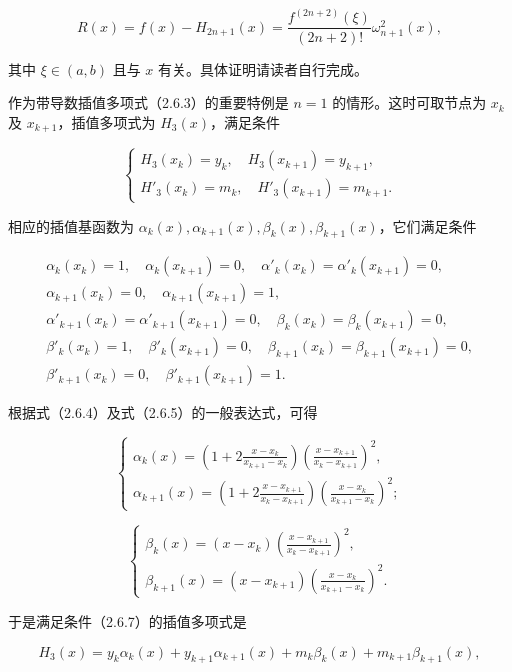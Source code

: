 \documentclass[
  10pt,
  fontset=fandol]{ctexart}
\begin{document}
\[R(x)=f(x)-H_{2n+1}(x)=\frac{f^{(2n+2)}(\xi)}{(2n+2)!}\omega_{n+1}^2(x),\tag{2.6.6}\]

其中 \(\xi\in(a,b)\) 且与 \(x\) 有关。具体证明请读者自行完成。

作为带导数插值多项式（2.6.3）的重要特例是 \(n=1\) 的情形。这时可取节点为 \(x_k\) 及 \(x_{k+1}\)，插值多项式为 \(H_3(x)\)，满足条件

\[\begin{cases}
H_3(x_k)=y_k,\quad H_3(x_{k+1})=y_{k+1},\\
H'_3(x_k)=m_k,\quad H'_3(x_{k+1})=m_{k+1}.
\end{cases}\tag{2.6.7}\]

相应的插值基函数为 \(\alpha_k(x),\alpha_{k+1}(x),\beta_k(x),\beta_{k+1}(x)\)，它们满足条件

\[\begin{gathered}
\alpha_k(x_k)=1,\quad\alpha_k(x_{k+1})=0,\quad\alpha'_k(x_k)=\alpha'_k(x_{k+1})=0,\\
\alpha_{k+1}(x_k)=0,\quad\alpha_{k+1}(x_{k+1})=1,\\
\alpha'_{k+1}(x_k)=\alpha'_{k+1}(x_{k+1})=0,\quad\beta_k(x_k)=\beta_k(x_{k+1})=0,\\
\beta'_k(x_k)=1,\quad\beta'_k(x_{k+1})=0,\quad\beta_{k+1}(x_k)=\beta_{k+1}(x_{k+1})=0,\\
\beta'_{k+1}(x_k)=0,\quad\beta'_{k+1}(x_{k+1})=1.
\end{gathered}\]

根据式（2.6.4）及式（2.6.5）的一般表达式，可得

\[\begin{cases}
\displaystyle\alpha_k(x)=\left(1+2\frac{x-x_k}{x_{k+1}-x_k}\right)\left(\frac{x-x_{k+1}}{x_k-x_{k+1}}\right)^2,\\[6pt]
\displaystyle\alpha_{k+1}(x)=\left(1+2\frac{x-x_{k+1}}{x_k-x_{k+1}}\right)\left(\frac{x-x_k}{x_{k+1}-x_k}\right)^2;
\end{cases}\tag{2.6.8}\]

\[\begin{cases}
\displaystyle\beta_k(x)=(x-x_k)\left(\frac{x-x_{k+1}}{x_k-x_{k+1}}\right)^2,\\[6pt]
\displaystyle\beta_{k+1}(x)=(x-x_{k+1})\left(\frac{x-x_k}{x_{k+1}-x_k}\right)^2.
\end{cases}\tag{2.6.9}\]

于是满足条件（2.6.7）的插值多项式是

\[H_3(x)=y_k\alpha_k(x)+y_{k+1}\alpha_{k+1}(x)+m_k\beta_k(x)+m_{k+1}\beta_{k+1}(x),\tag{2.6.10}\]
\end{document}
